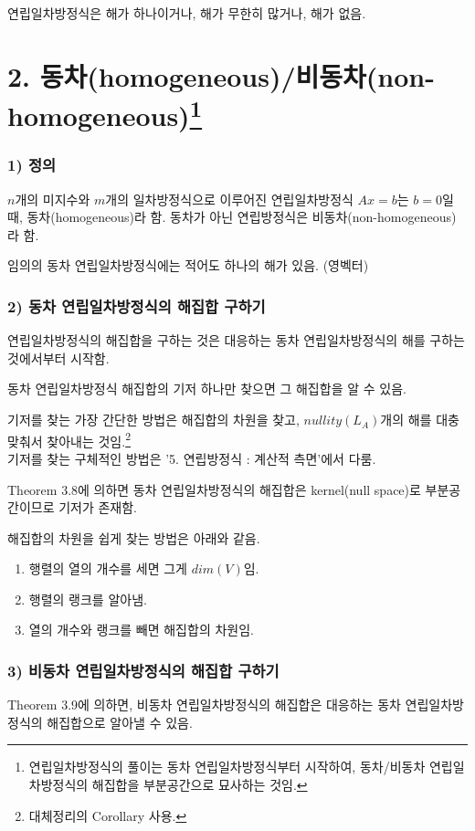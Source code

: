 연립일차방정식은 해가 하나이거나, 해가 무한히 많거나, 해가 없음.


\newpage


\section*{2. 동차(homogeneous)/비동차(non-homogeneous)\footnote{연립일차방정식의 풀이는 동차 연립일차방정식부터 시작하여, 동차/비동차 연립일차방정식의 해집합을 부분공간으로 묘사하는 것임.}}
\subsubsection*{1) 정의\\}
\begin{DEF}
$n$개의 미지수와 $m$개의 일차방정식으로 이루어진 연립일차방정식 $Ax=b$는 $b=0$일 때, 동차(homogeneous)라 함. 동차가 아닌 연립방정식은 비동차(non-homogeneous)라 함.
\end{DEF}

임의의 동차 연립일차방정식에는 적어도 하나의 해가 있음. (영벡터)

\subsubsection*{2) 동차 연립일차방정식의 해집합 구하기}
연립일차방정식의 해집합을 구하는 것은 대응하는 동차 연립일차방정식의 해를 구하는 것에서부터 시작함.

동차 연립일차방정식 해집합의 기저 하나만 찾으면 그 해집합을 알 수 있음.

기저를 찾는 가장 간단한 방법은 해집합의 차원을 찾고, $nullity(L_A)$개의 해를 대충 맞춰서 찾아내는 것임.\footnote{대체정리의 Corollary 사용.}\\
기저를 찾는 구체적인 방법은 '5. 연립방정식 : 계산적 측면'에서 다룸.

Theorem 3.8에 의하면 동차 연립일차방정식의 해집합은 kernel(null space)로 부분공간이므로 기저가 존재함.

해집합의 차원을 쉽게 찾는 방법은 아래와 같음.
\begin{enumerate}
    \item 행렬의 열의 개수를 세면 그게 $dim(V)$임.
    \item 행렬의 랭크를 알아냄.
    \item 열의 개수와 랭크를 빼면 해집합의 차원임.
\end{enumerate}

\subsubsection*{3) 비동차 연립일차방정식의 해집합 구하기}
Theorem 3.9에 의하면, 비동차 연립일차방정식의 해집합은 대응하는 동차 연립일차방정식의 해집합으로 알아낼 수 있음.

